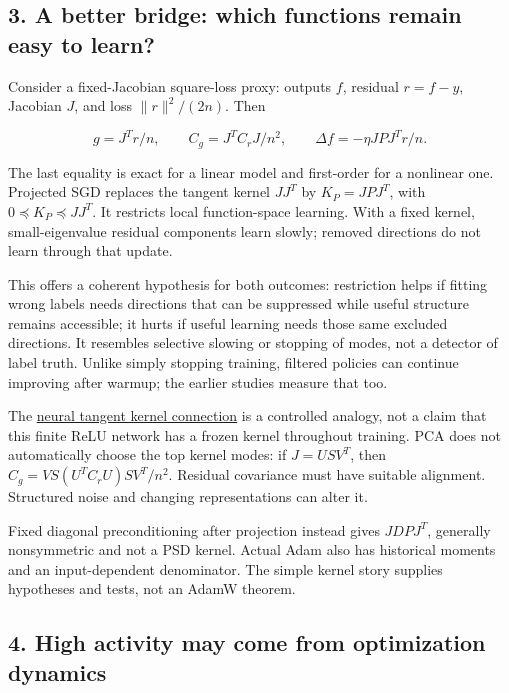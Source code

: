 \documentclass[
  british,
  10pt,
  a4paper,
]{article}
\begin{document}
\subsection{3. A better bridge: which functions remain easy to
learn?}\label{mathematics--a-better-bridge-which-functions-remain-easy-to-learn}

Consider a fixed-\allowbreak{}Jacobian square-\allowbreak{}loss proxy:
outputs \(f\), residual \(r=f-y\), Jacobian \(J\), and loss
\(\|r\|^2/(2n)\). Then

\[
g=J^Tr/n,\qquad C_g=J^TC_rJ/n^2,\qquad
\Delta f=-\eta JPJ^Tr/n.
\]

The last equality is exact for a linear model and
first-\allowbreak{}order for a nonlinear one. Projected SGD replaces the
tangent kernel \(JJ^T\) by \(K_P=JPJ^T\), with
\(0\preceq K_P\preceq JJ^T\). It restricts local
function-\allowbreak{}space learning. With a fixed kernel,
small-\allowbreak{}eigenvalue residual components learn slowly; removed
directions do not learn through that update.

This offers a coherent hypothesis for both outcomes: restriction helps
if fitting wrong labels needs directions that can be suppressed while
useful structure remains accessible; it hurts if useful learning needs
those same excluded directions.\allowbreak{} It resembles selective
slowing or stopping of modes, not a detector of label truth. Unlike
simply stopping training, filtered policies can continue improving after
warmup; the earlier studies measure that too.

The \href{https://arxiv.org/abs/1806.07572}{neural tangent kernel
connection} is a controlled analogy, not a claim that this finite ReLU
network has a frozen kernel throughout training. PCA does not
automatically choose the top kernel modes: if \(J=USV^T\), then
\(C_g=VS(U^TC_rU)SV^T/n^2\). Residual covariance must have suitable
alignment. Structured noise and changing representations can alter it.

Fixed diagonal preconditioning after projection instead gives
\(JDPJ^T\), generally nonsymmetric and not a PSD kernel. Actual Adam
also has historical moments and an input-\allowbreak{}dependent
denominator.\allowbreak{} The simple kernel story supplies hypotheses
and tests, not an AdamW theorem.

\subsection{4. High activity may come from optimization
dynamics}\label{mathematics--high-activity-may-come-from-optimization-dynamics}
\end{document}
